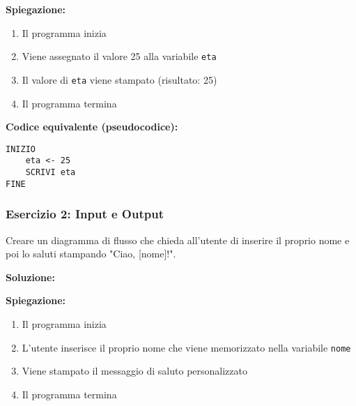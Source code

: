 \documentclass[a4paper,16pt]{article}
\begin{document}
\textbf{Spiegazione:}
\begin{enumerate}
    \item Il programma inizia
    \item Viene assegnato il valore 25 alla variabile \texttt{eta}
    \item Il valore di \texttt{eta} viene stampato (risultato: 25)
    \item Il programma termina
\end{enumerate}

\textbf{Codice equivalente (pseudocodice):}
\begin{lstlisting}
INIZIO
    eta <- 25
    SCRIVI eta
FINE
\end{lstlisting}

\newpage
\subsubsection{Esercizio 2: Input e Output}

\begin{tcolorbox}[colback=blue!5!white,colframe=blue!75!black,title=Traccia]
Creare un diagramma di flusso che chieda all'utente di inserire il proprio nome e poi lo saluti stampando "Ciao, [nome]!".
\end{tcolorbox}

\textbf{Soluzione:}

\begin{center}
\end{center}

\textbf{Spiegazione:}
\begin{enumerate}
    \item Il programma inizia
    \item L'utente inserisce il proprio nome che viene memorizzato nella variabile \texttt{nome}
    \item Viene stampato il messaggio di saluto personalizzato
    \item Il programma termina
\end{enumerate}
\end{document}
